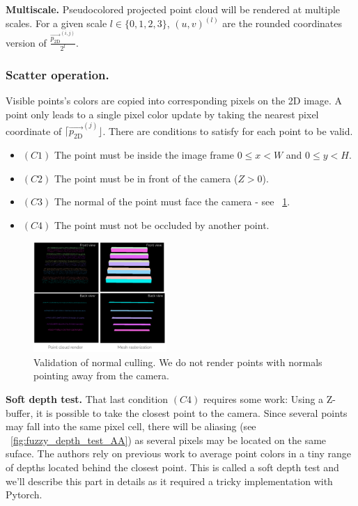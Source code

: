 \noindent \textbf{Multiscale.} Pseudocolored projected point cloud will be rendered at multiple scales. For a given scale $l \in \{0, 1, 2, 3\}$, 
$(u,v)^{(l)}$ are the rounded coordinates version of $\frac{\vec{p_{\textrm{2D}}}^{(i,j)}}{2^{l}}$.

\subsubsection{Scatter operation.}
\label{sec:scatter_op}


Visible points's colors are copied into corresponding pixels on the 2D image. A point only leads to a single pixel color update by taking the nearest pixel coordinate of $\lceil\vec{p_{\textrm{2D}}}^{(j)}\rfloor$. There are conditions to satisfy for each point to be valid. 
\begin{itemize}
    \item $(C1)$ The point must be inside the image frame $0\leq x<W$ and $0\leq y <H$.
    \item $(C2)$ The point must be in front of the camera ($Z>0$).
    \item $(C3)$ The normal of the point must face the camera - see ~\cref{fig:normal_culling_validation}.
    \item $(C4)$ The point must not be occluded by another point.
\end{itemize}

\begin{figure}[htpb]
    \centering
    \includegraphics[width=0.45\textwidth]{figures/normal_culling_validation.png}
    \caption{Validation of normal culling. We do not render points with normals pointing away from the camera.}
    \label{fig:normal_culling_validation}
\end{figure}


\pagebreak
\noindent \textbf{Soft depth test.} 
That last condition $(C4)$ requires some work:
Using a Z-buffer, it is possible to take the closest point to the camera. Since several points may fall into the same pixel cell, there will be aliasing (see ~\cref{fig:fuzzy_depth_test_AA}) as several pixels may be located on the same suface. The authors rely on previous work \cite{schutz2021rendering} to average point colors in a tiny range of depths located behind the closest point. This is called a soft depth test and we'll describe this part in details as it required a tricky implementation with Pytorch.

